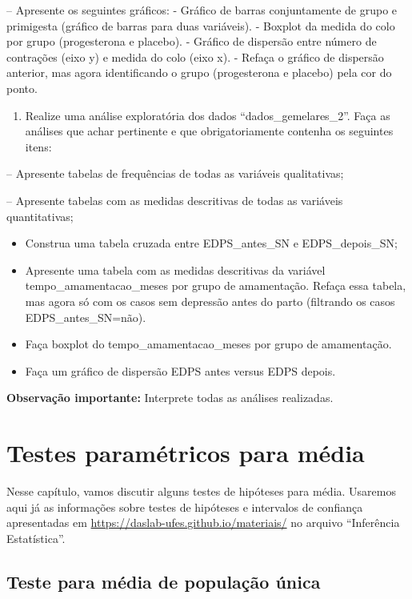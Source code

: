 \documentclass[
]{book}
\providecommand{\tightlist}{%
  \setlength{\itemsep}{0pt}\setlength{\parskip}{0pt}}
\begin{document}
-- Apresente os seguintes gráficos:
- Gráfico de barras conjuntamente de grupo e primigesta (gráfico de barras para duas variáveis).
- Boxplot da medida do colo por grupo (progesterona e placebo).
- Gráfico de dispersão entre número de contrações (eixo y) e medida do colo (eixo x).
- Refaça o gráfico de dispersão anterior, mas agora identificando o grupo (progesterona e placebo) pela cor do ponto.

\begin{enumerate}
\def\labelenumi{\arabic{enumi}.}
\setcounter{enumi}{1}
\tightlist
\item
  Realize uma análise exploratória dos dados ``dados\_gemelares\_2''. Faça as análises que achar pertinente e que obrigatoriamente contenha os seguintes itens:
\end{enumerate}

-- Apresente tabelas de frequências de todas as variáveis qualitativas;

-- Apresente tabelas com as medidas descritivas de todas as variáveis quantitativas;

\begin{itemize}
\item
  Construa uma tabela cruzada entre EDPS\_antes\_SN e EDPS\_depois\_SN;
\item
  Apresente uma tabela com as medidas descritivas da variável tempo\_amamentacao\_meses por grupo de amamentação. Refaça essa tabela, mas agora só com os casos sem depressão antes do parto (filtrando os casos EDPS\_antes\_SN=não).
\item
  Faça boxplot do tempo\_amamentacao\_meses por grupo de amamentação.
\item
  Faça um gráfico de dispersão EDPS antes versus EDPS depois.
\end{itemize}

\textbf{Observação importante:} Interprete todas as análises realizadas.

\hypertarget{param}{%
\chapter{Testes paramétricos para média}\label{param}}

Nesse capítulo, vamos discutir alguns testes de hipóteses para média.
Usaremos aqui já as informações sobre testes de hipóteses e intervalos de confiança apresentadas em \url{https://daslab-ufes.github.io/materiais/} no arquivo ``Inferência Estatística''.

\hypertarget{teste-para-muxe9dia-de-populauxe7uxe3o-uxfanica}{%
\section{Teste para média de população única}\label{teste-para-muxe9dia-de-populauxe7uxe3o-uxfanica}}
\end{document}

